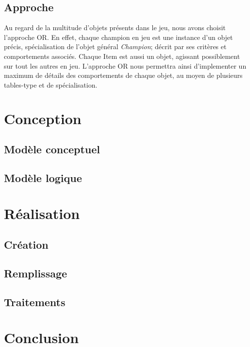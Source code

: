\documentclass[a4paper,10pt]{report}
\begin{document}
\section{Approche}
  Au regard de la multitude d'objets présents dans le jeu, nous avons choisit l'approche OR. En effet, chaque champion en jeu est une instance d'un objet précis, spécialisation de l'objet général \textit{Champion}; décrit par ses critères et comportements associés. Chaque Item est aussi un objet, agissant possiblement sur tout les autres en jeu. L'approche OR nous permettra ainsi d'implementer un maximum de détails des comportements de chaque objet, au moyen de plusieurs tables-type et de spécialisation.


\chapter{Conception}
\section{Modèle conceptuel}
\section{Modèle logique}



\chapter{Réalisation}
\section{Création}
\section{Remplissage}
\section{Traitements}


\chapter{Conclusion} %
\end{document}
